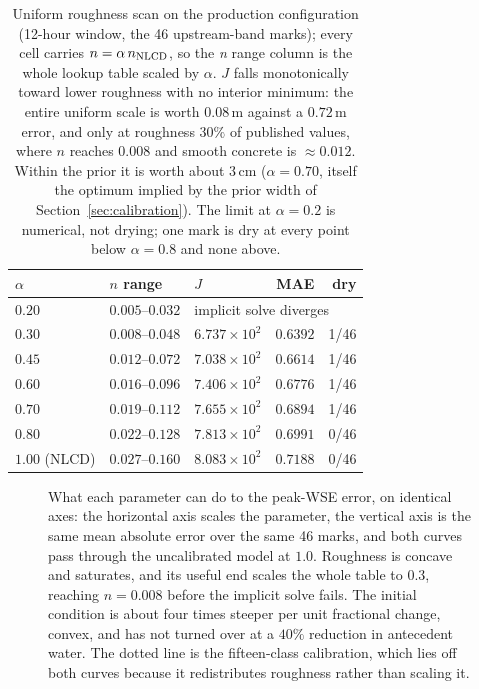\documentclass[11pt]{article}
\begin{document}
\begin{table}
\centering\small
\begin{tabular}{@{}lllrr@{}}
\toprule
$\alpha$ & $n$ range & $J$ & MAE & dry \\
\midrule
$0.20$ & $0.005$--$0.032$ & \multicolumn{3}{l}{implicit solve diverges} \\
$0.30$ & $0.008$--$0.048$ & $6.737\times10^{2}$ & $0.6392$ & 1/46 \\
$0.45$ & $0.012$--$0.072$ & $7.038\times10^{2}$ & $0.6614$ & 1/46 \\
$0.60$ & $0.016$--$0.096$ & $7.406\times10^{2}$ & $0.6776$ & 1/46 \\
$0.70$ & $0.019$--$0.112$ & $7.655\times10^{2}$ & $0.6894$ & 1/46 \\
$0.80$ & $0.022$--$0.128$ & $7.813\times10^{2}$ & $0.6991$ & 0/46 \\
$1.00$ (NLCD) & $0.027$--$0.160$ & $8.083\times10^{2}$ & $0.7188$ & 0/46 \\
\bottomrule
\end{tabular}
\caption{Uniform roughness scan on the production configuration
(12-hour window, the 46 upstream-band marks); every cell carries
$n = \alpha\,n_{\rm NLCD}$, so the \emph{n} range column is the whole
lookup table scaled by $\alpha$. $J$ falls monotonically toward
lower roughness with no interior minimum: the entire uniform scale
is worth $0.08$\,m against a $0.72$\,m error, and only at roughness
$30\%$ of published values, where $n$ reaches $0.008$ and smooth
concrete is $\approx 0.012$. Within the prior it is worth about
$3$\,cm ($\alpha = 0.70$, itself the optimum implied by the prior width
of Section~\ref{sec:calibration}). The limit at $\alpha = 0.2$ is
numerical, not drying; one mark is dry at every point below
$\alpha = 0.8$ and none above.}
\label{tab:alpha}
\end{table}

\begin{figure}[t]
\centering

\caption{What each parameter can do to the peak-WSE error, on identical
axes: the horizontal axis scales the parameter, the vertical axis is the
same mean absolute error over the same 46 marks, and both curves pass
through the uncalibrated model at $1.0$. Roughness is concave and
saturates, and its useful end scales the whole table to $0.3$,
reaching $n = 0.008$ before the implicit solve fails. The
initial condition is about four times steeper per unit fractional
change, convex, and has not turned over at a $40\%$ reduction in
antecedent water. The dotted line is the fifteen-class calibration,
which lies off both curves because it redistributes roughness rather
than scaling it.}
\label{fig:authority}
\end{figure}
\end{document}
